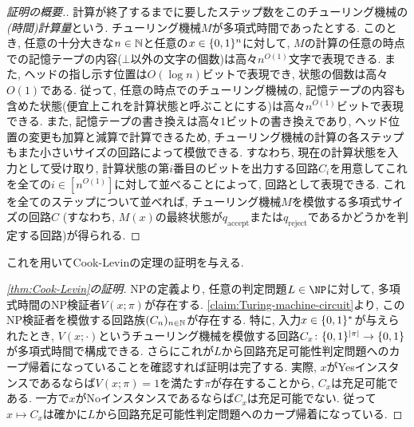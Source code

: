 \begin{proof}[証明の概要.]
  計算が終了するまでに要したステップ数をこのチューリング機械の\emph{(時間)計算量}という.
  チューリング機械$M$が多項式時間であったとする. このとき, 任意の十分大きな$n\in\mathbb{N}$と任意の$x\in\{0,1\}^n$に対して, $M$の計算の任意の時点での記憶テープの内容($\bot$以外の文字の個数)は高々$n^{O(1)}$文字で表現できる.
  また, ヘッドの指し示す位置は$O(\log n)$ビットで表現でき, 状態の個数は高々$O(1)$である.
  従って, 任意の時点でのチューリング機械の, 記憶テープの内容も含めた状態(便宜上これを計算状態と呼ぶことにする)は高々$n^{O(1)}$ビットで表現できる.
  また, 記憶テープの書き換えは高々$1$ビットの書き換えであり, ヘッド位置の変更も加算と減算で計算できるため,
  チューリング機械の計算の各ステップもまた小さいサイズの回路によって模倣できる. すなわち, 現在の計算状態を入力として受け取り, 計算状態の第$i$番目のビットを出力する回路$C_i$を用意してこれを全ての$i\in[n^{O(1)}]$に対して並べることによって, 回路として表現できる.
  これを全てのステップについて並べれば, チューリング機械$M$を模倣する多項式サイズの回路$C$ (すなわち, $M(x)$の最終状態が$q_{\mathrm{accept}}$または$q_{\mathrm{reject}}$であるかどうかを判定する回路)が得られる.
\end{proof}

これを用いてCook-Levinの定理の証明を与える.

\begin{proof}[\cref{thm:Cook-Levin}の証明]
  NPの定義より, 任意の判定問題$L\in\NP$に対して, 多項式時間のNP検証者$V(x;\pi)$が存在する.
  \cref{claim:Turing-machine-circuit}より, このNP検証者を模倣する回路族$(C_n)_{n\in\mathbb{N}}$が存在する.
  特に, 入力$x\in\{0,1\}^*$が与えられたとき, $V(x;\cdot)$というチューリング機械を模倣する回路$C_x\colon\{0,1\}^{\abs{\pi}}\to\{0,1\}$が多項式時間で構成できる.
  さらにこれが$L$から回路充足可能性判定問題へのカープ帰着になっていることを確認すれば証明は完了する.
  実際, $x$がYesインスタンスであるならば$V(x;\pi)=1$を満たす$\pi$が存在することから, $C_x$は充足可能である.
  一方で$x$がNoインスタンスであるならば$C_x$は充足可能でない.
  従って$x\mapsto C_x$は確かに$L$から回路充足可能性判定問題へのカープ帰着になっている.
\end{proof}

